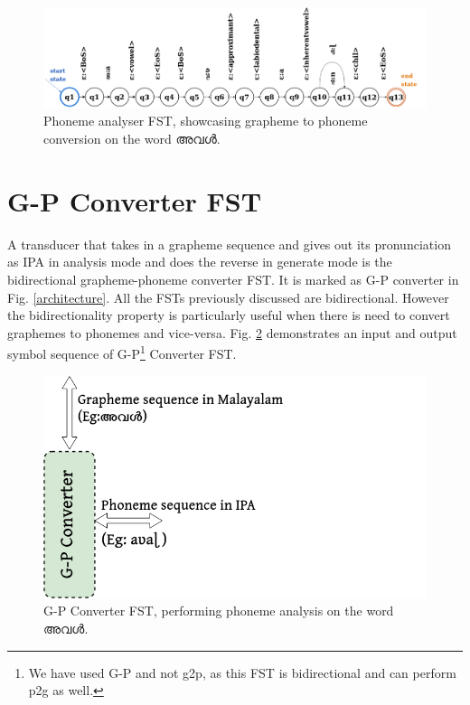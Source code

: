 \begin{figure}[htpb]
	\centering
	\includegraphics[width=\linewidth]{analysis-fst.png}
	\caption{Phoneme analyser FST, showcasing grapheme to phoneme conversion on the word {\mal അവൾ}.}
	\label{phanalysissfst}
\end{figure}

\section{G-P Converter FST}

A transducer that takes in a grapheme sequence and gives out its pronunciation
as IPA in analysis mode and does the reverse in generate mode is the
bidirectional grapheme-phoneme converter FST. It is marked as G-P converter in
Fig. \ref{architecture}. All the FSTs previously discussed are bidirectional.
However the bidirectionality property is particularly useful when there is need
to convert graphemes to phonemes and vice-versa. Fig. \ref{gpconverterfst}
demonstrates an input and output symbol sequence of G-P\footnote{We have used G-P and not \gls{g2p}, as this FST is bidirectional and can perform \gls{p2g} as well.} Converter FST.

\begin{figure}[htpb]
	\centering
	\includegraphics[scale=0.5]{g-pconverter-drawio.png}
	\caption{G-P Converter FST, performing phoneme analysis on the word {\mal അവൾ}.}
	\label{gpconverterfst}
\end{figure}

